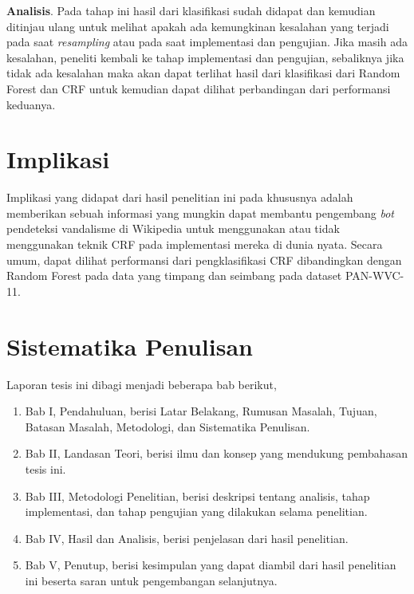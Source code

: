 \documentclass[12pt,a4paper,titlepage]{article}
\begin{document}
\textbf{Analisis}.
Pada tahap ini hasil dari klasifikasi sudah didapat dan kemudian ditinjau ulang untuk melihat apakah ada kemungkinan kesalahan yang terjadi pada saat \textit{resampling} atau pada saat implementasi dan pengujian.
Jika masih ada kesalahan, peneliti kembali ke tahap implementasi dan pengujian, sebaliknya jika tidak ada kesalahan maka akan dapat terlihat hasil dari klasifikasi dari Random Forest dan CRF untuk kemudian dapat dilihat perbandingan dari performansi keduanya.


\section{Implikasi}\label{sec:implikasi}

Implikasi yang didapat dari hasil penelitian ini pada khususnya adalah memberikan sebuah informasi yang mungkin dapat membantu pengembang \textit{bot} pendeteksi vandalisme di Wikipedia untuk menggunakan atau tidak menggunakan teknik CRF pada implementasi mereka di dunia nyata.
Secara umum, dapat dilihat performansi dari pengklasifikasi CRF dibandingkan dengan Random Forest pada data yang timpang dan seimbang pada dataset PAN-WVC-11.


\section{Sistematika Penulisan}\label{sec:sistematika-penulisan}

Laporan tesis ini dibagi menjadi beberapa bab berikut,
\begin{enumerate}
	\item Bab I, Pendahuluan, berisi Latar Belakang, Rumusan Masalah, Tujuan, Batasan Masalah, Metodologi, dan Sistematika Penulisan.
	\item Bab II, Landasan Teori, berisi ilmu dan konsep yang mendukung pembahasan tesis ini.
	\item Bab III, Metodologi Penelitian, berisi deskripsi tentang analisis, tahap implementasi, dan tahap pengujian yang dilakukan selama penelitian.
	\item Bab IV, Hasil dan Analisis, berisi penjelasan dari hasil penelitian.
	\item Bab V, Penutup, berisi kesimpulan yang dapat diambil dari hasil penelitian ini beserta saran untuk pengembangan selanjutnya.
\end{enumerate}
\end{document}
